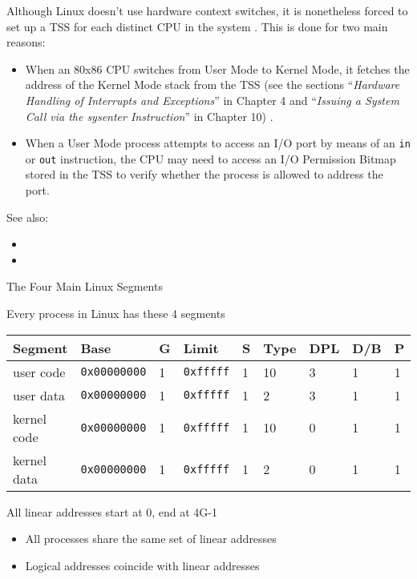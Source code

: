 Although Linux doesn't use hardware context switches, it is nonetheless forced to set up a
TSS for each distinct CPU in the system . This is done for two main reasons:
\begin{itemize}
\item When an 80x86 CPU switches from User Mode to Kernel Mode, it fetches the address of
  the Kernel Mode stack from the TSS (see the sections ``\emph{Hardware Handling of
    Interrupts and Exceptions}'' in Chapter 4 and ``\emph{Issuing a System Call via the
    sysenter Instruction}'' in Chapter 10) .
\item When a User Mode process attempts to access an I/O port by means of an \texttt{in}
  or \texttt{out} instruction, the CPU may need to access an I/O Permission Bitmap stored
  in the TSS to verify whether the process is allowed to address the port. 
\end{itemize}

See also:
\begin{itemize}
\item {}
\item {}
\end{itemize}

\begin{frame}{The Four Main Linux Segments}
  \begin{block}{Every process in Linux has these 4 segments}
    \begin{center}
      \begin{scriptsize}
        \begin{tabular}{|l|l|l|l|l|l|l|l|l|}
          \hline
          \textbf{Segment}&\textbf{Base}&\textbf{G}&\textbf{Limit}&\textbf{S}&\textbf{Type}&\textbf{DPL}&\textbf{D/B}&\textbf{P}\\\hline
          user code&\texttt{0x00000000}&1&\texttt{0xfffff}&1&10&3&1&1\\\hline
          user data&\texttt{0x00000000}&1&\texttt{0xfffff}&1&2&3&1&1\\\hline
          kernel code&\texttt{0x00000000}&1&\texttt{0xfffff}&1&10&0&1&1\\\hline
          kernel data&\texttt{0x00000000}&1&\texttt{0xfffff}&1&2&0&1&1\\\hline
        \end{tabular}
      \end{scriptsize}
    \end{center}
  \end{block}
    \begin{block}{All linear addresses start at 0, end at 4G-1}
    \begin{itemize}
    \item All processes share the same set of linear addresses
    \item Logical addresses coincide with linear addresses
    \end{itemize}
  \end{block}
\end{frame}

